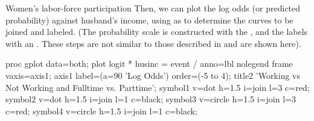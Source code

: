 \begin{Example}[wlfpart]{Women's labor-force participation}
Then, we can plot the log odds (or predicted probability) against
husband's income, using  as to determine the curves to be
joined and labeled.
(The probability scale is constructed with the , and the
labels with an \ADS.  These steps are not similar to those described
in  and are
shown here).

\begin{listing}
proc gplot data=both;
   plot logit * husinc = event /
        anno=lbl nolegend frame vaxis=axis1;
   axis1 label=(a=90 'Log Odds') order=(-5 to 4);
   title2 'Working vs Not Working and Fulltime vs. Parttime';
   symbol1 v=dot    h=1.5 i=join l=3 c=red;
   symbol2 v=dot    h=1.5 i=join l=1 c=black;
   symbol3 v=circle h=1.5 i=join l=3 c=red;
   symbol4 v=circle h=1.5 i=join l=1 c=black;
\end{listing}
\end{Example}
